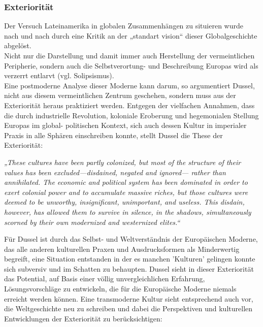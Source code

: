 \subsubsection{Exteriorität}

Der Versuch Lateinamerika in globalen Zusammenhängen zu situieren wurde nach und
nach durch eine Kritik an der „standart vision“\footnotemark {} dieser Globalgeschichte
abgelöst.\\
 Nicht nur die Darstellung und damit immer auch Herstellung der
vermeintlichen Peripherie, sondern auch die Selbstverortung- und Beschreibung
Europas wird als verzerrt entlarvt (vgl. Solipsismus).\footnotemark
{}\\
 Eine postmoderne Analyse
dieser Moderne kann darum, so argumentiert Dussel, nicht aus diesem
vermeintlichen Zentrum geschehen, sondern muss aus der Exteriorität heraus
praktiziert werden. Entgegen der vielfachen Annahmen, dass die durch
industrielle Revolution, koloniale Eroberung und hegemonialen Stellung Europas
im global- politischen Kontext, sich auch dessen Kultur in imperialer Praxis in alle Sphären einschreiben konnte, stellt Dussel die These der Exteriorität:
\begin{myenv} 
    \textit{„These cultures have been partly colonized, but most of the
    structure of their values has been excluded—disdained, negated and ignored—
    rather than annihilated. The economic and political system has been
    dominated in order to exert colonial power and to accumulate massive riches,
    but those cultures were deemed to be unworthy, insignificant, unimportant,
    and useless. This disdain, however, has allowed them to survive in silence,
in the shadows, simultaneously scorned by their own modernized and westernized
elites.“\footnotemark {}} \end{myenv}
Für Dussel ist durch das Selbst- und Weltverständnis der Europäischen Moderne,
das alle anderen kulturellen Praxen und Ausdrucksformen als Minderwertig
begreift, eine Situation entstanden in der es manchen 'Kulturen' gelingen konnte
sich subversiv und im Schatten zu behaupten. Dussel sieht in dieser Exteriorität
das Potential, auf Basis einer völlig unvergleichlichen Erfahrung,
Lösungsvorschläge zu entwickeln, die für die Europäische Moderne niemals
erreicht werden können. Eine transmoderne Kultur sieht entsprechend auch vor,
die Weltgeschichte neu zu schreiben und dabei die Perspektiven und kulturellen
Entwicklungen der Exteriorität zu berücksichtigen:
